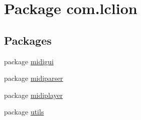 \hypertarget{namespacecom_1_1lclion}{\section{Package com.\+lclion}
\label{namespacecom_1_1lclion}
}
\subsection*{Packages}
\begin{DoxyCompactItemize}
\item 
package \hyperlink{namespacecom_1_1lclion_1_1midigui}{midigui}
\item 
package \hyperlink{namespacecom_1_1lclion_1_1midiparser}{midiparser}
\item 
package \hyperlink{namespacecom_1_1lclion_1_1midiplayer}{midiplayer}
\item 
package \hyperlink{namespacecom_1_1lclion_1_1utils}{utils}
\end{DoxyCompactItemize}
